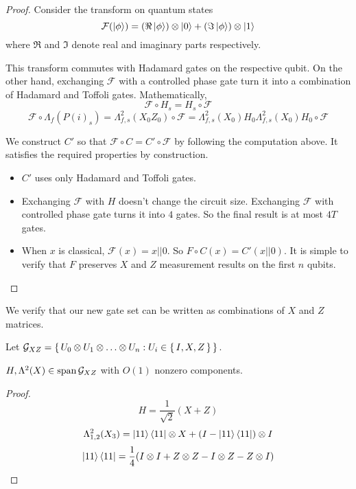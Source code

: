 \begin{proof}

	Consider the transform on quantum states
	$$\mathcal{F}(\ket{\phi})=(\Re\ket{\phi})\otimes\ket{0}+(\Im\ket{\phi})\otimes\ket{1}$$
	where $\Re$ and $\Im$ denote real and imaginary parts respectively.

	This transform commutes with Hadamard gates on the respective qubit. On the other hand, exchanging $\mathcal{F}$ with a controlled phase gate turn it into a combination of Hadamard and Toffoli gates. Mathematically,
	$$\mathcal{F}\circ H_s=H_s\circ\mathcal{F}$$
	$$\mathcal{F}\circ\Lambda_f(P(i)_s)=\Lambda^2_{f,s}(X_0Z_0)\circ\mathcal{F}=\Lambda^2_{f,s}(X_0)H_0\Lambda^2_{f,s}(X_0)H_0\circ\mathcal{F}$$

	We construct $C'$ so that $\mathcal{F}\circ C=C'\circ\mathcal{F}$ by following the computation above. It satisfies the required properties by construction.
	\begin{itemize}
		\item $C'$ uses only Hadamard and Toffoli gates.
		\item Exchanging $\mathcal{F}$ with $H$ doesn't change the circuit size. Exchanging $\mathcal{F}$ with controlled phase gate turns it into $4$ gates. So the final result is at most $4T$ gates.
		\item When $x$ is classical, $\mathcal{F}(x)=x||0$. So $F\circ C(x)=C'(x||0)$. It is simple to verify that $F$ preserves $X$ and $Z$ measurement results on the first $n$ qubits.
	\end{itemize}
\end{proof}

We verify that our new gate set can be written as combinations of $X$ and $Z$ matrices.

\begin{definition}
	Let $\mathcal{G}_{XZ}=\set{U_0\otimes U_1\otimes\ldots\otimes U_n: U_i\in\set{I,X,Z}}$.
\end{definition}

\begin{theorem}
	$H,\Lambda^2(X)\in\operatorname*{\operatorname{span}}\mathcal{G}_{XZ}$ with $O(1)$ nonzero components.
\end{theorem}

\begin{proof}
	$$H=\frac{1}{\sqrt{2}}(X+Z)$$
	$$\Lambda^2_{1,2}(X_3)=\ket{11}\bra{11}\otimes X+(I-\ket{11}\bra{11})\otimes I$$
	$$\ket{11}\bra{11}=\frac{1}{4}(I\otimes I+Z\otimes Z-I\otimes Z-Z\otimes I)$$
\end{proof}

